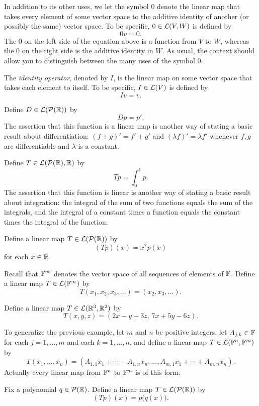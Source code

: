 \begin{example}\label{ax:3.3}\leavevmode
\begin{axprops}
\item[zero] In addition to its other uses, we let the symbol $0$ denote the
  linear map that takes every element of some vector space to the additive
  identity of another (or possibly the same) vector space. To be specific,
  $0\in\mathcal{L}(V,W)$ is defined by
  \[ 0v=0. \]
  The $0$ on the left side of the equation above is a function from $V$ to
  $W$, whereas the $0$ on the right side is the additive identity in $W$. As
  usual, the context should allow you to distinguish between the many uses of
  the symbol $0$.
\item[identity operator] The \emph{identity operator}, denoted by $I$, is the
  linear map on some vector space that takes each element to itself. To be
  specific, $I\in\mathcal{L}(V)$ is defined by
  \[ Iv=v. \]
\item[differentiation] Define $D\in\mathcal{L}(\mathcal{P}(\mathbb{R}))$ by
  \[ Dp=p'. \]
  The assertion that this function is a linear map is another way of stating
  a basic result about differentiation: $(f+g)'=f'+g'$ and
  $(\lambda f)'=\lambda f'$ whenever $f,g$ are differentiable and $\lambda$ is
  a constant.
\item[integration] Define $T\in\mathcal{L}(\mathcal{P}(\mathbb{R}),\mathbb{R})$ by
  \[ Tp=\int_0^1 p. \]
  The assertion that this function is linear is another way of stating a basic
  result about integration: the integral of the sum of two functions equals
  the sum of the integrals, and the integral of a constant times a function
  equals the constant times the integral of the function.
\item[multiplication by $x^2$] Define a linear map $T\in\mathcal{L}(\mathcal{P}(\mathbb{R}))$ by
  \[ (Tp)(x)=x^2p(x) \]
  for each $x\in\mathbb{R}$.
\item[backward shift] Recall that $\mathbb{F}^\infty$ denotes the vector space of all
  sequences of elements of $\mathbb{F}$. Define a linear map $T\in\mathcal{L}(\mathbb{F}^\infty)$ by
  \[ T(x_1,x_2,x_3,\dots)=(x_2,x_3,\dots). \]
\item[from $\R^3$ to $\R^2$] Define a linear map $T\in\mathcal{L}(\mathbb{R}^3,\mathbb{R}^2)$ by
  \[ T(x,y,z)=(2x-y+3z,\,7x+5y-6z). \]
\item[from $\F^n$ to $\F^m$] To generalize the previous example, let $m$ and
  $n$ be positive integers, let $A_{j,k}\in\mathbb{F}$ for each $j=1,\dots,m$ and each
  $k=1,\dots,n$, and define a linear map $T\in\mathcal{L}(\mathbb{F}^n,\mathbb{F}^m)$ by
  \[ T(x_1,\dots,x_n)=(A_{1,1}x_1+\cdots+A_{1,n}x_n,\dots,
     A_{m,1}x_1+\cdots+A_{m,n}x_n). \]
  Actually every linear map from $\F^n$ to $\F^m$ is of this form.
\item[composition] Fix a polynomial $q\in\mathcal{P}(\mathbb{R})$. Define a linear map
  $T\in\mathcal{L}(\mathcal{P}(\mathbb{R}))$ by
  \[ (Tp)(x)=p\bigl(q(x)\bigr). \]
\end{axprops}
\end{example}

